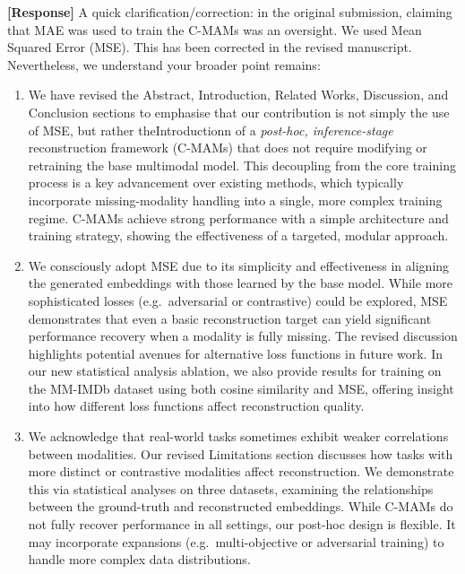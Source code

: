 \documentclass{article}
\begin{document}
\noindent\textbf{[Response]} A quick clarification/correction: in the original submission, claiming that MAE was used to train the C-MAMs was an oversight. We used Mean Squared Error (MSE). This has been corrected in the revised manuscript. Nevertheless, we understand your broader point remains:

\begin{enumerate}
    \item We have revised the Abstract, Introduction, Related Works, Discussion, and Conclusion sections to emphasise that our contribution is not simply the use of MSE, but rather theIntroductionn of a \emph{post-hoc, inference-stage} reconstruction framework (C-MAMs) that does not require modifying or retraining the base multimodal model. This decoupling from the core training process is a key advancement over existing methods, which typically incorporate missing-modality handling into a single, more complex training regime. C-MAMs achieve strong performance with a simple architecture and training strategy, showing the effectiveness of a targeted, modular approach.
    \item We consciously adopt MSE due to its simplicity and effectiveness in aligning the generated embeddings with those learned by the base model. While more sophisticated losses (e.g.\ adversarial or contrastive) could be explored, MSE demonstrates that even a basic reconstruction target can yield significant performance recovery when a modality is fully missing. The revised discussion highlights potential avenues for alternative loss functions in future work. In our new statistical analysis ablation, we also provide results for training on the MM-IMDb dataset using both cosine similarity and MSE, offering insight into how different loss functions affect reconstruction quality.
    \item We acknowledge that real-world tasks sometimes exhibit weaker correlations between modalities. Our revised Limitations section discusses how tasks with more distinct or contrastive modalities affect reconstruction. We demonstrate this via statistical analyses on three datasets, examining the relationships between the ground-truth and reconstructed embeddings. While C-MAMs do not fully recover performance in all settings, our post-hoc design is flexible. It may incorporate expansions (e.g.\ multi-objective or adversarial training) to handle more complex data distributions.
\end{enumerate}

\vspace{0.25cm}
\hline
\vspace{0.25cm}
\end{document}
